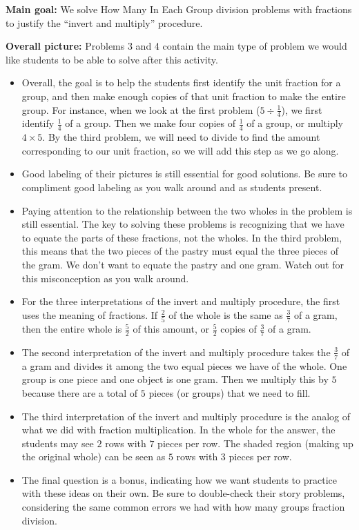 \documentclass[nooutcomes,noauthor, handout]{ximera}
\begin{document}
\begin{instructorNotes} 



{\bf Main goal:} We solve How Many In Each Group division problems with fractions to justify the ``invert and multiply'' procedure.


{\bf Overall picture:} Problems 3 and 4 contain the main type of problem we would like students to be able to solve after this activity. 






\begin{itemize}
	\item Overall, the goal is to help the students first identify the unit fraction for a group, and then make enough copies of that unit fraction to make the entire group. For instance, when we look at the first problem ($5 \div \frac{1}{4}$), we first identify $\frac{1}{4}$ of a group. Then we make four copies of $\frac{1}{4}$ of a group, or multiply $4 \times 5$. By the third problem, we will need to divide to find the amount corresponding to our unit fraction, so we will add this step as we go along.
	\item Good labeling of their pictures is still essential for good solutions. Be sure to compliment good labeling as you walk around and as students present.
	\item Paying attention to the relationship between the two wholes in the problem is still essential. The key to solving these problems is recognizing that we have to equate the parts of these fractions, not the wholes. In the third problem, this means that the two pieces of the pastry must equal the three pieces of the gram. We don't want to equate the pastry and one gram. Watch out for this misconception as you walk around.
	\item For the three interpretations of the invert and multiply procedure, the first uses the meaning of fractions. If $\frac{2}{5}$ of the whole is the same as $\frac{3}{7}$ of a gram, then the entire whole is $\frac{5}{2}$ of this amount, or $\frac{5}{2}$ copies of $\frac{3}{7}$ of a gram.
	\item The second interpretation of the invert and multiply procedure takes the $\frac{3}{7}$ of a gram and divides it among the two equal pieces we have of the whole. One group is one piece and one object is one gram. Then we multiply this by $5$ because there are a total of $5$ pieces (or groups) that we need to fill.
	\item The third interpretation of the invert and multiply procedure is the analog of what we did with fraction multiplication. In the whole for the answer, the students may see $2$ rows with $7$ pieces per row. The shaded region (making up the original whole) can be seen as $5$ rows with $3$ pieces per row.
	\item The final question is a bonus, indicating how we want students to practice with these ideas on their own. Be sure to double-check their story problems, considering the same common errors we had with how many groups fraction division.
\end{itemize}



\end{instructorNotes}
\end{document}
